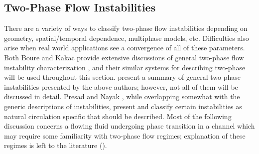\subsection{Two-Phase Flow Instabilities}
There are a variety of ways to classify two-phase flow instabilities depending on geometry, spatial/temporal dependence, multiphase models, etc.
Difficulties also arise when real world applications see a convergence of all of these parameters.
Both Boure \etal and Kakac \etal provide extensive discussions of general two-phase flow instability characterization \cite{boure_review_1973,kakac_review_2008}, and their similar systems for describing two-phase will be used throughout this section.
 present a summary of general two-phase instabilities presented by the above authors; however, not all of them will be discussed in detail.
Presad \etal \cite{durgaprasad_review_2007} and Nayak \etal \cite{nayak_flow_2008}, while overlapping somewhat with the generic descriptions of instabilities, present and classify certain instabilities as natural circulation specific that should be described.
Most of the following discussion concerns a flowing fluid undergoing phase transition in a channel which may require some familiarity with two-phase flow regimes; explanation of these regimes is left to the literature (\eg \cite{thome_chapter_2004,tong_boiling_1997,ghiaasiaan_twophase_2007}).


